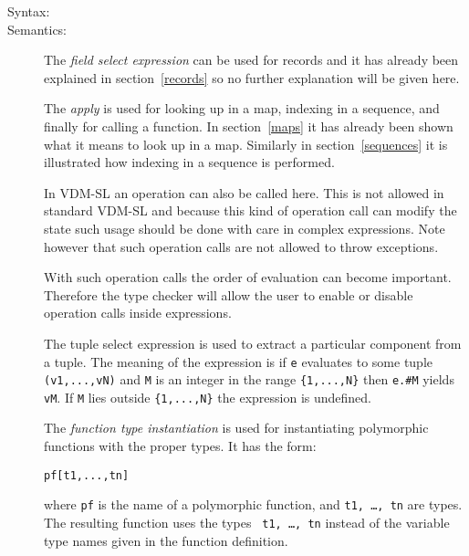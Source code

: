 \documentclass[\pformat,12pt]{article}
\newcommand{\vdmslpp}[2]{%
#1
}
\newcommand{\vdmpp}{VDM++}
\begin{document}
\begin{description}
\item[Syntax:]




    
\item[Semantics:] The {\it field select expression} can be used for records
  and it has already been explained in section~\ref{records} so no further
  explanation will be given here.
     
  The {\it apply} is used for looking up in a map, indexing in a
  sequence, and finally for calling a function. In section~\ref{maps} it
  has already been shown what it means to look up in a map. Similarly in
  section~\ref{sequences} it is illustrated how indexing in a sequence is
  performed.

  In  \vdmslpp{VDM-SL}{\vdmpp} an operation can also be called 
  here. This is not allowed in standard VDM-SL and because this kind of
  operation call can modify the state such usage should be done with
  care in complex expressions. Note however that such operation calls
  are not allowed to throw exceptions.

  With such operation calls the order of evaluation can become
  important. Therefore the type checker will allow the user to enable
  or disable operation calls inside expressions.

  The tuple select expression is used to extract a particular
  component from a tuple. The meaning of the expression is if
  \texttt{e} evaluates to some tuple
  \texttt{(v1,...,vN)} and \texttt{M} is an integer in the
  range \verb+{1,...,N}+ then \texttt{e.\#M} yields \texttt{vM}. If
  \texttt{M} lies outside \verb+{1,...,N}+ the expression is undefined.

  The {\it function type instantiation\/} is used for instantiating
  polymorphic functions with the proper types. It has the form:
  \begin{alltt}
    pf [ t1, ..., tn ]
  \end{alltt}
  where {\tt pf} is the name of a polymorphic function, and {\tt t1,
    \ldots, tn} are types. The resulting function uses the types {\tt
    t1, \ldots, tn} instead of the variable type names given in the
  function definition.


\end{description}
\end{document}

